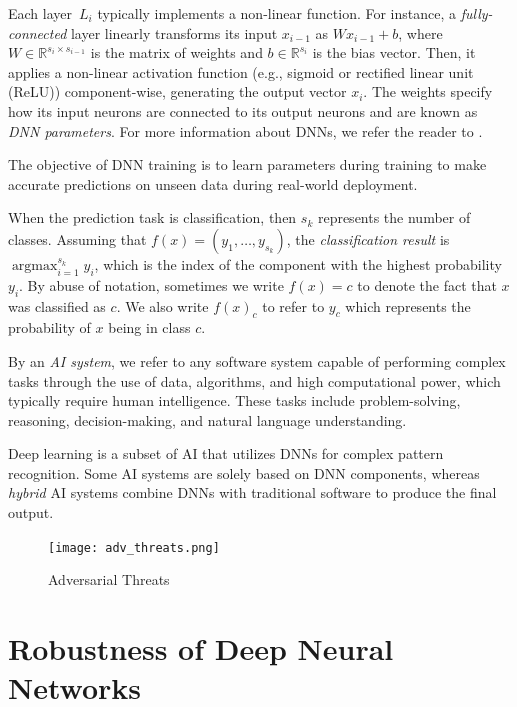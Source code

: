 Each layer~$L_i$ typically implements a non-linear function. For instance, a \emph{fully-connected} layer linearly transforms its input $x_{i-1}$ as $W x_{i-1} + b$, where $W\in\mathbb{R}^{s_{i} \times s_{i-1}}$ is the matrix of weights and $b\in\mathbb{R}^{s_i}$ is the bias vector. Then, it applies a non-linear activation function (e.g., sigmoid or rectified linear unit (ReLU)) component-wise, generating the output vector $x_i$. The weights specify how its input neurons are connected to its output neurons and are known as \emph{DNN parameters}. For more information about DNNs, we refer the reader to \cite{dnn_archi, Hassija, Liang}.

The objective of DNN training is to learn parameters during training to make accurate predictions on unseen data during real-world deployment.

When the prediction task is classification, then $s_k$ represents the number of classes. Assuming that $f(x) = (y_1,\dots,y_{s_k})$, the \emph{classification result} is $\displaystyle\mathop{\text{argmax}}_{i=1}^{s_k} y_i$, which is the index of the component with the highest probability $y_i$. By abuse of notation, sometimes we write $f(x)=c$ to denote the fact that $x$ was classified as $c$. We also write $f(x)_c$ to refer to $y_c$ which represents the probability of $x$ being in class $c$.

By an \emph{AI system}, we refer to any software system capable of performing complex tasks through the use of data, algorithms, and high computational power, which typically require human intelligence. These tasks include problem-solving, reasoning, decision-making, and natural language understanding.

Deep learning is a subset of AI that utilizes DNNs for complex pattern recognition. Some AI systems are solely based on DNN components, whereas \emph{hybrid} AI systems combine DNNs with traditional software to produce the final output.

\begin{figure}[h]
  \centering
  \texttt{[image: adv\_threats.png]}
  \caption{Adversarial Threats}
  \label{fig:adv_threats}
\end{figure}
\section{Robustness of Deep Neural Networks}

